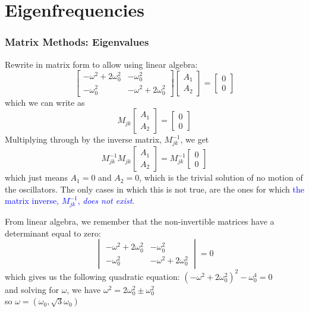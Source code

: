 \documentclass[pdf,handout, hideothersubsections]{beamer}
\begin{document}
\section{Eigenfrequencies}
\begin{frame}
\frametitle{Matrix Methods: Eigenvalues}
\pause
Rewrite in matrix form to allow using linear algebra: \\
\[
\begin{bmatrix}
-\omega^2 + 2 \omega_0^2 & -\omega_0^2 \\
-\omega_0^2 & -\omega^2 + 2 \omega_0^2
\end{bmatrix}
\begin{bmatrix}
A_1 \\
A_2
\end{bmatrix}
=
\begin{bmatrix}
0 \\
0
\end{bmatrix}
\]
\pause
which we can write as
\[
M_{j k} 
\begin{bmatrix}
A_1 \\
A_2
\end{bmatrix}
=
\begin{bmatrix}
0 \\
0
\end{bmatrix}
\]
\pause
Multiplying through by the inverse matrix, $M_{jk}^{-1}$, we get
\[
M_{jk}^{-1} M_{j k} 
\begin{bmatrix}
A_1 \\
A_2
\end{bmatrix}
=
M_{jk}^{-1}
\begin{bmatrix}
0 \\
0
\end{bmatrix}
\]
\pause
which just means $A_1 = 0$ and $A_2 = 0$, which is the trivial
solution of no motion of the oscillators. 
\pause
The only cases in which
this is not true, are the ones for which \textcolor{blue}{the matrix inverse,
$M_{jk}^{-1}$, \emph{does not exist}}.

\end{frame}


\begin{frame}
From linear algebra, we remember that the non-invertible matrices have
a determinant equal to zero:
\[
\begin{vmatrix}
-\omega^2 + 2 \omega_0^2 & -\omega_0^2 \\
-\omega_0^2 & -\omega^2 + 2 \omega_0^2
\end{vmatrix}
= 0
\]
\pause
which gives us the following quadratic equation:
\pause
$(-\omega^2 + 2 \omega_0^2)^2 -\omega_0^4 = 0$ \\
\pause
and solving for $\omega$, we have
\centering
\pause
$\omega^2 = 2 \omega_0^2 \pm \omega_0^2$ \\
\pause
so $\omega = (\omega_0, \sqrt{3} \omega_0)$

\end{frame}
\end{document}
